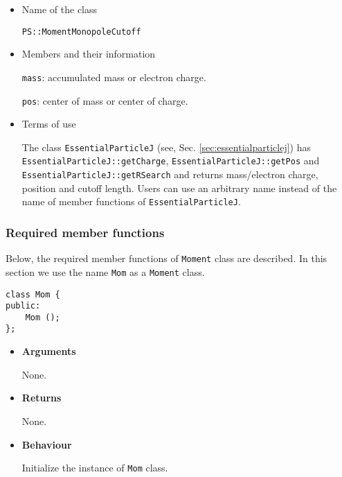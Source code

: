 \begin{itemize}

\item Name of the class

  \texttt{PS::MomentMonopoleCutoff}

\item Members and their information

  \texttt{mass}: accumulated mass or electron charge.

  \texttt{pos}: center of mass or center of charge.

\item Terms of use

  The class \texttt{EssentialParticleJ} (see, Sec. \ref{sec:essentialparticlej})
  has \texttt{EssentialParticleJ::getCharge}, \texttt{EssentialParticleJ::getPos}
  and \texttt{EssentialParticleJ::getRSearch} and returns mass/electron charge,
  position and cutoff length. Users can use an arbitrary name instead of the name
  of member functions of \texttt{EssentialParticleJ}.

\end{itemize}

\subsubsection{Required member functions}


Below, the required member functions of \texttt{Moment} class are described.
In this section we use the name \texttt{Mom} as a \texttt{Moment} class.


\begin{screen}
\begin{verbatim}
class Mom {
public:
    Mom ();
};
\end{verbatim}
\end{screen}

\begin{itemize}
  
\item {\bf Arguments}

  None.
  
\item {\bf Returns}

  None.

\item {\bf Behaviour}

  Initialize the instance of \texttt{Mom} class.
  
\end{itemize}


